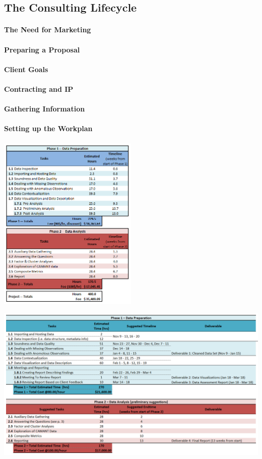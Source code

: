 \subsection{The Consulting Lifecycle}
\paragraph{The Need for Marketing}
\paragraph{Preparing a Proposal}
\paragraph{Client Goals}
\paragraph{Contracting and IP}
\paragraph{Gathering Information}
\paragraph{Setting up the Workplan}
\begin{center}
    \includegraphics[width=0.5\textwidth]{documents/workplan1}
\end{center}
\begin{center}
    \includegraphics[width=\textwidth]{documents/workplan2}
\end{center}
